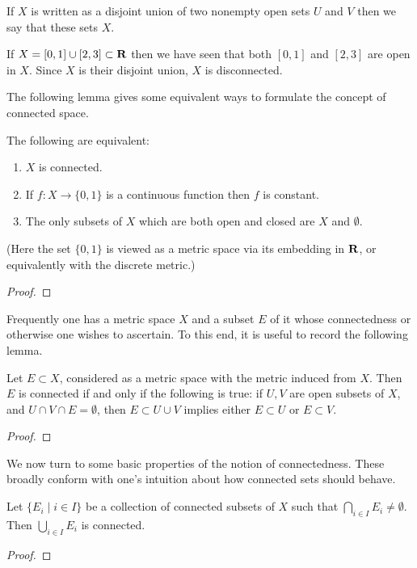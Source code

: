 If $X$ is written as a disjoint union of two nonempty open sets $U$ and $V$ then we say that these sets  $X$.

\begin{example}
If $X=[0,1]\cup[2,3]\subset\mathbf R$ then we have seen that both $[0,1]$ and $[2,3]$ are open in $X$. Since $X$ is their disjoint union, $X$ is disconnected.
\end{example}

The following lemma gives some equivalent ways to formulate the concept of connected space.

\begin{lemma}
The following are equivalent:
\begin{enumerate}[label=(\roman*)]
\item $X$ is connected.
\item If $f:X\to\{0,1\}$ is a continuous function then $f$ is constant.
\item The only subsets of $X$ which are both open and closed are $X$ and $\emptyset$.
\end{enumerate}
(Here the set $\{0,1\}$ is viewed as a metric space via its embedding in $\mathbf R$, or equivalently with the discrete metric.)
\end{lemma}

\begin{proof}

\end{proof}

Frequently one has a metric space $X$ and a subset $E$ of it whose connectedness or otherwise one wishes to ascertain. To this end, it is useful to record the following lemma.

\begin{lemma}
Let $E\subset X$, considered as a metric space with the metric induced from $X$. Then $E$ is connected if and only if the following is true: if $U,V$ are open subsets of $X$, and $U\cap V\cap E=\emptyset$, then $E\subset U\cup V$ implies either $E\subset U$ or $E\subset V$.
\end{lemma}

\begin{proof}

\end{proof}

We now turn to some basic properties of the notion of connectedness. These broadly conform with one's intuition about how connected sets should behave.

\begin{lemma}
Let $\{E_i\mid i\in I\}$ be a collection of connected subsets of $X$ such that $\bigcap_{i\in I}E_i\neq\emptyset$. Then $\bigcup_{i\in I}E_i$ is connected.
\end{lemma}

\begin{proof}

\end{proof}

